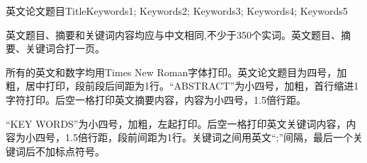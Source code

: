 %
%

\begin{enabstract}{英文论文题目Title}{Keywords1; Keywords2; Keywords3; Keywords4; Keywords5}

英文题目、摘要和关键词内容均应与中文相同,不少于350个实词。英文题目、摘要、关键词合打一页。

所有的英文和数字均用Times New Roman字体打印。英文论文题目为四号，加粗，居中打印，段前段后间距为1行。“ABSTRACT”为小四号，加粗，首行缩进1字符打印。后空一格打印英文摘要内容，内容为小四号，1.5倍行距。

“KEY WORDS”为小四号，加粗，左起打印。后空一格打印英文关键词内容，内容为小四号，1.5倍行距，段前间距为1行。关键词之间用英文“;”间隔，最后一个关键词后不加标点符号。

\end{enabstract}

